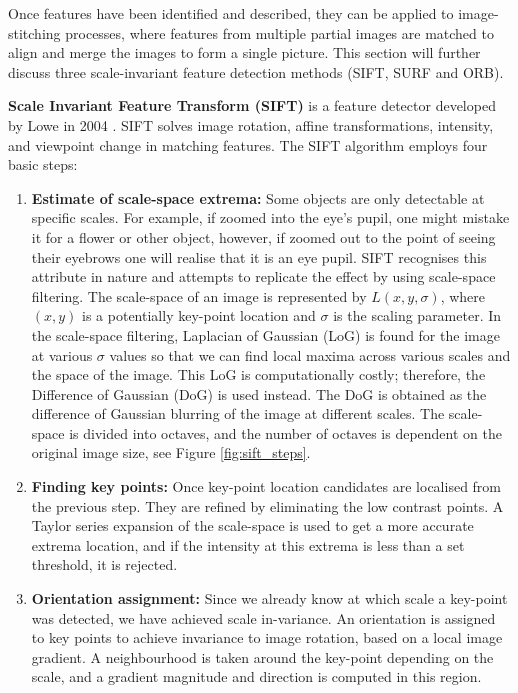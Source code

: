 Once features have been identified and described, they can be applied to image-stitching processes, where features from multiple partial images are matched to align and merge the images to form a single picture. This section will further discuss three scale-invariant feature detection methods (SIFT, SURF and ORB).

\textbf{Scale Invariant Feature Transform (SIFT)} is a feature detector developed by Lowe in 2004 \cite{Lowe2004}. SIFT solves image rotation, affine transformations, intensity, and viewpoint change in matching features. The SIFT algorithm employs four basic steps:

\begin{enumerate}
\item \textbf{Estimate of scale-space extrema:} Some objects are only detectable at specific scales. For example, if zoomed into the eye's pupil, one might mistake it for a flower or other object, however, if zoomed out to the point of seeing their eyebrows one will realise that it is an eye pupil. SIFT recognises this attribute in nature and attempts to replicate the effect by using scale-space filtering. The scale-space of an image is represented by $L(x, y, \sigma)$, where $(x, y)$ is a potentially key-point location and $\sigma$ is the scaling parameter. In the scale-space filtering, Laplacian of Gaussian (LoG) is found for the image at various $\sigma$ values so that we can find local maxima across various scales and the space of the image. This LoG is computationally costly; therefore, the Difference of Gaussian (DoG) is used instead. The DoG is obtained as the difference of Gaussian blurring of the image at different scales. The scale-space is divided into octaves, and the number of octaves is dependent on the original image size, see Figure \ref{fig:sift_steps}.
\item\textbf{Finding key points:} Once key-point location candidates are localised from the previous step. They are refined by eliminating the low contrast points. A Taylor series expansion of the scale-space is used to get a more accurate extrema location, and if the intensity at this extrema is less than a set threshold, it is rejected.
\item \textbf{Orientation assignment:} Since we already know at which scale a key-point was detected, we have achieved scale in-variance. An orientation is assigned to key points to achieve invariance to image rotation, based on a local image gradient. A neighbourhood is taken around the key-point depending on the scale, and a gradient magnitude and direction is computed in this region.

\end{enumerate}
